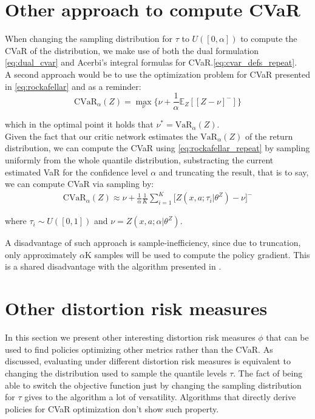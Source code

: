 \section{Other approach to compute CVaR} \label{sec:other_cvar_computations}

When changing the sampling distribution for $\tau$ to $U([0,\alpha])$
to compute the CVaR of the
distribution, we make use of both the dual formulation \ref{eq:dual_cvar} and Acerbi's
integral formulas for CVaR.\ref{eq:cvar_defs_repeat}.\\
A second approach would be to use the \citet{Rockafellar2000} optimization problem
for CVaR presented in \ref{eq:rockafellar} and as a reminder:
\begin{equation}
    \text{CVaR}_\alpha (Z) = \underset{\nu} \max \big\{\nu + \frac{1}{\alpha} \mathbb E_Z[[Z- \nu]^-]\big\} \label{eq:rockafellar_repeat}
\end{equation}

which in the optimal point it holds that $\nu^*=\text{VaR}_\alpha(Z)$.\\
Given the fact that our critic network estimates the $\text{VaR}_\alpha(Z)$ of the
return distribution, we can compute the CVaR using \ref{eq:rockafellar_repeat}
by sampling uniformly from  the whole quantile distribution, substracting the current
estimated VaR for the confidence level  $\alpha$ and truncating the result, that is to say,
we can compute CVaR via sampling by:
\begin{align}
    \text{CVaR}_\alpha(Z) \approx \nu + \frac{1}{\alpha} \frac{1}{K}
\sum_{i=1}^K \big[ Z(x,a; \tau_i\vert \theta^Z) - \nu \big]^- 
\end{align}

where $\tau_i \sim U([0,1])$ and $\nu = Z(x,a; \alpha \vert \theta^Z)$.

A disadvantage of such approach is sample-inefficiency, since due to truncation, 
only approximately $\alpha$K samples will be used to compute the policy gradient.
This is a shared disadvantage with the algorithm presented in
\citet{Chow2014}.

\section{Other distortion risk measures}\label{sec:other_risk_measures}

In this section we present other interesting distortion risk measures $\phi$ that can be used
to find policies optimizing other metrics rather than the CVaR.
As discussed, evaluating under different distortion risk measures is equivalent to
changing the distribution used to sample the quantile levels $\tau$.
The fact of being able to switch the objective function just by changing the sampling distribution
for $\tau$ gives to the algorithm a lot of versatility.
Algorithms that directly derive policies for CVaR optimization \citep{Chow2014,Tamar2015a}
don't show such property.

